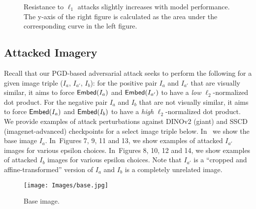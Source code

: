 \documentclass[12pt]{article}
\begin{document}
\begin{figure}[ht]
\centering
{}
{}
\caption{Resistance to $\ell_1$ attacks slightly increases with model performance. The y-axis of the right figure is calculated as the area under the corresponding curve in the left figure.}
\label{fig:attack_resistance_l1}
\end{figure}

\clearpage

\subsection{Attacked Imagery}\label{subsec:attacked_imagery}

Recall that our PGD-based adversarial attack seeks to perform the following for a given image triple ($I_a$, $I_{a'}$, $I_b$): for the positive pair $I_a$ and $I_{a'}$ that are visually similar, it aims to force $\mathsf{Embed}(I_a)$ and $\mathsf{Embed}(I_{a'})$ to have a \textit{low} $\ell_2$-normalized dot product.
For the negative pair $I_a$ and $I_b$ that are not visually similar, it aims to force $\mathsf{Embed}(I_a)$ and $\mathsf{Embed}(I_b)$ to have a \textit{high} $\ell_2$-normalized dot product.
We provide examples of attack perturbations against DINOv2 (giant) and SSCD (imagenet-advanced) checkpoints for a select image triple below.
In~ we show the base image $I_a$.
In~Figures 7, 9, 11 and 13, we show examples of attacked $I_{a'}$ images for various epsilon choices.
In~Figures 8, 10, 12 and 14, we show examples of attacked $I_{b}$ images for various epsilon choices.
Note that $I_{a'}$ is a ``cropped and affine-transformed'' version of $I_a$ and $I_b$ is a completely unrelated image.

\begin{figure}[ht]
    \centering
    \texttt{[image: Images/base.jpg]}
    \caption{Base image.}
    \label{fig:base}
\end{figure}
\end{document}
